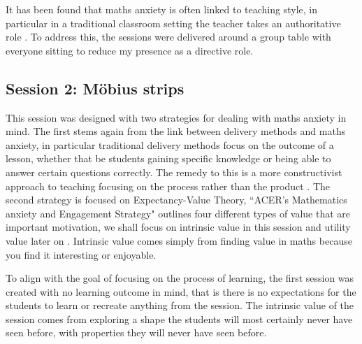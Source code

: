 \documentclass[11pt, a4paper, notitlepage]{article}
\begin{document}
\par It has been found that maths anxiety is often linked to teaching style, in particular in a traditional classroom setting the teacher takes an authoritative role \cite{Finlayson:2014}. To address this, the sessions were delivered around a group table with everyone sitting to reduce my presence as a directive role. 


\subsection{Session 2: M\"obius strips}
This session was designed with two strategies for dealing with maths anxiety in mind. The first stems again from the link between delivery methods and maths anxiety, in particular traditional delivery methods focus on the outcome of a lesson, whether that be students gaining specific knowledge or being able to answer certain questions correctly. The remedy to this is a more constructivist approach to teaching focusing on the process rather than the product \cite{Finlayson:2014}. The second strategy is focused on Expectancy-Value Theory, ``ACER's Mathematics anxiety and Engagement Strategy" outlines four different types of value that are important motivation, we shall focus on intrinsic value in this session and utility value later on \cite{MAES:2024} . Intrinsic value comes simply from finding value in maths because you find it interesting or enjoyable.

\par

To align with the goal of focusing on the process of learning, the first session was created with no learning outcome in mind, that is there is no expectations for the students to learn or recreate anything from the session. The intrinsic value of the session comes from exploring a shape the students will most certainly never have seen before, with properties they will never have seen before. 
\end{document}
